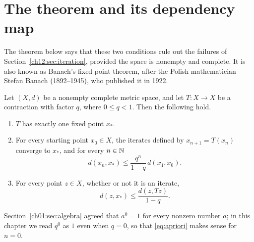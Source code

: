 \section{The theorem and its dependency map}\label{ch12:sec:theorem}
The theorem below says that these two conditions rule out the failures of Section~\ref{ch12:sec:iteration}, provided the space is nonempty and complete. It is also known as Banach's fixed-point theorem, after the Polish mathematician Stefan Banach (1892--1945), who published it in 1922.
\par\noindent\begin{minipage}{\linewidth}
\begin{theorem}\label{thm:banach}
Let $(X,d)$ be a nonempty complete metric space, and let $T:X\to X$ be a contraction with factor $q$, where $0\le q<1$. Then the following hold.
\begin{enumerate}
\item $T$ has exactly one fixed point $x_*$.
\item For every starting point $x_0\in X$, the iterates defined by $x_{n+1}=T(x_n)$ converge to $x_*$, and for every $n\in\mathbb N$
\begin{equation}\label{eq:apriori}
d(x_n,x_*)\le\frac{q^n}{1-q}\,d(x_1,x_0).
\end{equation}
\item For every point $z\in X$, whether or not it is an iterate,
\begin{equation}\label{eq:residual}
d(z,x_*)\le\frac{d(z,Tz)}{1-q}.
\end{equation}
\end{enumerate}
\end{theorem}
\end{minipage}\par

Section~\ref{ch01:sec:algebra} agreed that $a^0=1$ for every nonzero number $a$; in this chapter we read $q^0$ as $1$ even when $q=0$, so that \eqref{eq:apriori} makes sense for $n=0$.

